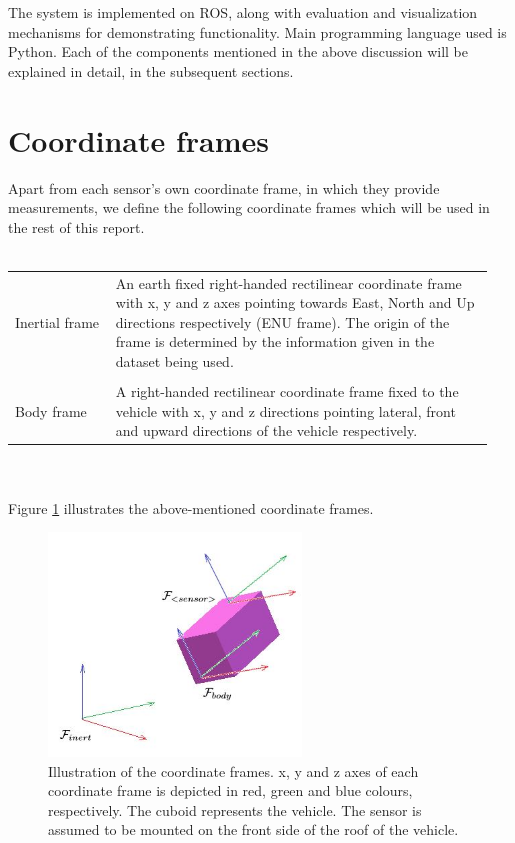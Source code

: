 The system is implemented on \gls{ROS}, along with evaluation and visualization mechanisms for demonstrating functionality. Main programming language used is Python. Each of the components mentioned in the above discussion will be explained in detail, in the subsequent sections.







\section{Coordinate frames}
Apart from each sensor's own coordinate frame, in which they provide measurements, we define the following coordinate frames which will be used in the rest of this report.\\\\
\begin{tabular}{p{0.2\linewidth} p{0.75\linewidth} } 
	Inertial frame & An earth fixed right-handed rectilinear coordinate frame with x, y and z axes pointing towards East, North and Up directions respectively (ENU frame). The origin of the frame is determined by the information given in the dataset being used.\\\\
	Body frame & A right-handed rectilinear coordinate frame fixed to the vehicle with x, y and z directions pointing lateral, front and upward directions of the vehicle respectively.
\end{tabular}\\\\
Figure \ref{fig:pa:coordinateFrames} illustrates the above-mentioned coordinate frames.
\begin{figure}[htp]
	\begin{center}
	\includegraphics[width=0.6\textwidth]{figs/coordinate-frames.jpg}
	\end{center}
	\vspace{-0.5cm}
	\caption[Coordinate frames]{Illustration of the coordinate frames. x, y and z axes of each coordinate frame is depicted in red, green and blue colours, respectively. The cuboid represents the vehicle. The sensor is assumed to be mounted on the front side of the roof of the vehicle.}
	\label{fig:pa:coordinateFrames}
	\vspace{0.5cm}
\end{figure}






